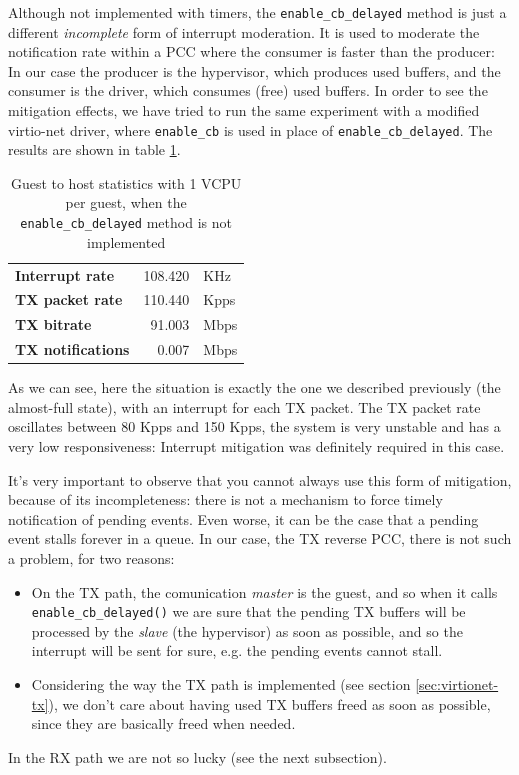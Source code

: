 Although not implemented with timers, the \texttt{enable\_cb\_delayed} method is just a different \emph{incomplete} form of interrupt 
moderation.
It is used to moderate the notification rate within a PCC where the consumer is faster than the producer: In our case
the producer is the hypervisor, which produces used buffers, and the consumer is the driver, which consumes (free) used buffers.
In order to see the mitigation effects, we have tried to run the same experiment with a modified virtio-net driver, where \texttt{enable\_cb}
is used in place of \texttt{enable\_cb\_delayed}. The results are shown in table \ref{tab:virtionet-tx-nomit-g2h1vcpu}.

\begin{table}
\begin{center}
\begin{tabular}{lrl}
\toprule
\textbf{Interrupt rate} & 108.420 & KHz\\
\textbf{TX packet rate} & 110.440 & Kpps\\
\textbf{TX bitrate} & 91.003 & Mbps\\
\textbf{TX notifications} & 0.007 & Mbps\\
\bottomrule
\end{tabular}
\end{center}
\caption{Guest to host statistics with 1 VCPU per guest, when the \texttt{enable\_cb\_delayed} method is not implemented}
\label{tab:virtionet-tx-nomit-g2h1vcpu}
\end{table}

As we can see, here the situation is exactly the one we described previously (the almost-full state), with an interrupt for each TX packet.
The TX packet rate oscillates between 80 Kpps and 150 Kpps, the system is very unstable and has a very low responsiveness: Interrupt
mitigation was definitely required in this case.

\vspace{0.5cm}

It's very important to observe that you cannot always use this form of mitigation, because of its incompleteness: there is not a 
mechanism to force timely notification of pending events. Even worse, it can be the case that a pending event stalls forever in a 
queue.
In our case, the TX reverse PCC, there is not such a problem, for two reasons:
\begin{itemize}
  \item On the TX path, the comunication \emph{master} is the guest, and so when it calls \texttt{enable\_cb\_delayed()} we are sure
	that the pending TX buffers will be processed by the \emph{slave} (the hypervisor) as soon as possible, and so the interrupt
	will be sent for sure, e.g. the pending events cannot stall.
	
  \item Considering the way the TX path is implemented (see section \ref{sec:virtionet-tx}), we don't care about having used TX buffers
	freed as soon as possible, since they are basically freed when needed.
\end{itemize}
In the RX path we are not so lucky (see the next subsection).

